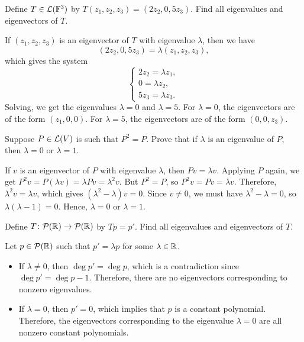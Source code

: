 \begin{exc}
\begin{exercise}
Define $T\in\mathcal{L}(\mathbb{F}^3)$ by $T(z_1,z_2,z_3)=(2z_2,0,5z_3)$. Find all eigenvalues
and eigenvectors of $T$.
\end{exercise}
\begin{solution}
If $(z_1,z_2,z_3)$ is an eigenvector of $T$ with eigenvalue $\lambda$, then we
have
\[ (2z_2,0,5z_3) = \lambda(z_1,z_2,z_3), \]
which gives the system
\[ \begin{cases} 2z_2=\lambda z_1,\\ 0=\lambda z_2,\\ 5z_3=\lambda z_3.
   \end{cases} \]
Solving, we get the eigenvalues $\lambda=0$ and $\lambda=5$. For $\lambda=0$,
the eigenvectors are of the form $(z_1,0,0)$. For $\lambda=5$, the eigenvectors
are of the form $(0,0,z_3)$.
\end{solution}

\begin{exercise}
Suppose $P\in\mathcal{L}(V)$ is such that $P^2=P$. Prove that if $\lambda$ is an
eigenvalue of $P$, then $\lambda=0$ or $\lambda=1$.
\end{exercise}
\begin{solution}
If $v$ is an eigenvector of $P$ with eigenvalue $\lambda$, then $Pv=\lambda v$.
Applying $P$ again, we get $P^2v=P(\lambda v)=\lambda Pv=\lambda^2v$. But
$P^2=P$, so $P^2v=Pv=\lambda v$. Therefore, $\lambda^2v=\lambda v$, which gives
$(\lambda^2-\lambda)v=0$. Since $v\ne0$, we must have $\lambda^2-\lambda=0$, so
$\lambda(\lambda-1)=0$. Hence, $\lambda=0$ or $\lambda=1$.
\end{solution}

\begin{exercise}
Define $T\colon\mathcal{P}(\mathbb{R})\to\mathcal{P}(\mathbb{R})$ by $Tp=p'$. Find all eigenvalues and
eigenvectors of $T$.
\end{exercise}
\begin{solution}
Let $p\in\mathcal{P}(\mathbb{R})$ such that $p'=\lambda p$ for some $\lambda\in\mathbb{R}$.
\begin{itemize}
\item If $\lambda\ne0$, then $\deg p'=\deg p$, which is a contradiction since
  $\deg p'=\deg p-1$. Therefore, there are no eigenvectors corresponding to
  nonzero eigenvalues.
\item If $\lambda=0$, then $p'=0$, which implies that $p$ is a constant
  polynomial. Therefore, the eigenvectors corresponding to the eigenvalue
  $\lambda=0$ are all nonzero constant polynomials. \qedhere
\end{itemize}
\end{solution}


\end{exc}
